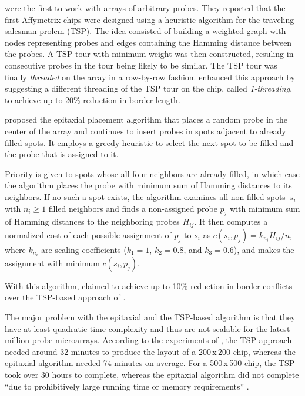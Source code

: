 \documentclass{bioinfo}
\begin{document}
\citealp{HANNENHALLI02} were the first to work with arrays of arbitrary probes. They reported that the first Affymetrix chips were designed using a heuristic algorithm for the traveling salesman prolem (TSP). The idea consisted of building a weighted graph with nodes representing probes and edges containing the Hamming distance between the probes. A TSP tour with minimum weight was then constructed, resuling in consecutive probes in the tour being likely to be similar. The TSP tour was finally \emph{threaded} on the array in a row-by-row fashion. \citealp{HANNENHALLI02} enhanced this approach by suggesting a different threading of the TSP tour on the chip, called \emph{1-threading}, to achieve up to 20\% reduction in border length.

\citealp{KAHNG02} proposed the epitaxial placement algorithm that places a random probe in the center of the array and continues to insert probes in spots adjacent to already filled spots. It employs a greedy heuristic to select the next spot to be filled and the probe that is assigned to it.

Priority is given to spots whose all four neighbors are already filled, in which case the algorithm places the probe with minimum sum of Hamming distances to its neighbors. If no such a spot exists, the algorithm examines all non-filled spots~$s_i$ with $n_i \geq 1$ filled neighbors and finds a non-assigned probe $p_j$ with minimum sum of Hamming distances to the neighboring probes $H_{ij}$. It then computes a normalized cost of each possible assignment of $p_j$ to $s_i$ as $c(s_i,p_j) = k_{n_i} H_{ij} / n$, where $k_{n_i}$ are scaling coefficients ($k_1 = 1$, $k_2 = 0.8$, and $k_3 = 0.6$), and makes the assignment with minimum $c(s_i,p_j)$.

With this algorithm, \citealp{KAHNG02} claimed to achieve up to 10\% reduction in border conflicts over the TSP-based approach of \citealp{HANNENHALLI02}.

The major problem with the epitaxial and the TSP-based algorithm is that they have at least quadratic time complexity and thus are not scalable for the latest million-probe microarrays. According to the experiments of \citealp{KAHNG03_1}, the TSP approach needed around 32 minutes to produce the layout of a 200\,x\,200 chip, whereas the epitaxial algorithm needed 74 minutes on average. For a 500\,x\,500 chip, the TSP took over 30 hours to complete, whereas the epitaxial algorithm did not complete ``due to prohibitively large running time or memory requirements'' \citep{KAHNG03_1}.
\end{document}
